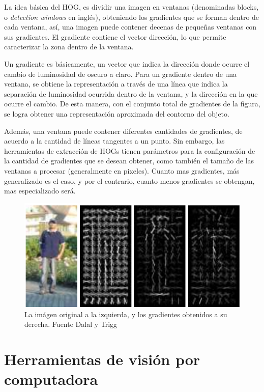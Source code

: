 \documentclass[a4paper,12pt,oneside,spanish]{book}
\begin{document}
La idea básica del HOG, es dividir una imagen en ventanas (denominadas blocks, o \textit{detection windows} en inglés), obteniendo los gradientes que se forman dentro de cada ventana, así, una imagen puede contener decenas de pequeñas ventanas con sus gradientes. El gradiente contiene el vector dirección, lo que permite caracterizar la zona dentro de la ventana.\par

Un gradiente es básicamente, un vector que indica la dirección donde ocurre el cambio de luminosidad de oscuro a claro. Para un gradiente dentro de una ventana, se obtiene la representación a través de una línea que indica la separación de luminosidad ocurrida dentro de la ventana, y la dirección en la que ocurre el cambio. De esta manera, con el conjunto total de gradientes de la figura, se logra obtener una representación aproximada del contorno del objeto.\par

Además, una ventana puede contener diferentes cantidades de gradientes, de acuerdo a la cantidad de líneas tangentes a un punto. Sin embargo, las herramientas de extracción de HOGs tienen parámetros para la configuración de la cantidad de gradientes que se desean obtener, como también el tamaño de las ventanas a procesar (generalmente en pixeles). Cuanto mas gradientes, más generalizado es el caso, y por el contrario, cuanto menos gradientes se obtengan, mas especializado será.\par

\begin{figure}[h!]
	\includegraphics[width=340pt]{Imagenes/hog1.jpg}
	\centering
	\caption{La imágen original a la izquierda, y los gradientes obtenidos a su derecha. Fuente Dalal y Trigg \cite{hog1} }
	\label{fig:hog1}
\end{figure}
 

\section{Herramientas de visión por computadora}
\end{document}
